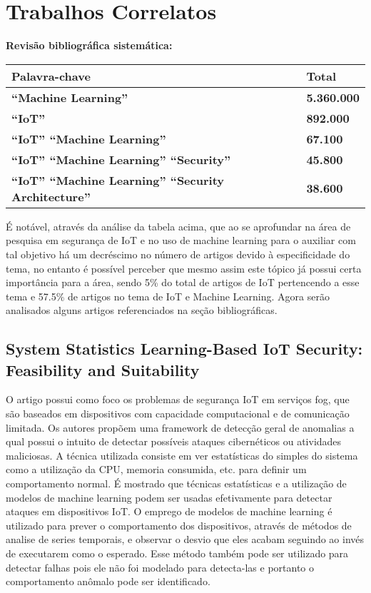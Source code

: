 \documentclass[article,12pt]{abntex2}
\begin{document}
\section{Trabalhos Correlatos}
\textbf{Revisão bibliográfica sistemática:}\\
\begin{tabular}{l l}
    \toprule
    \textbf{Palavra-chave}& \textbf{Total}  \\
    \midrule
    \textbf{``Machine Learning''}& \textbf{ 5.360.000 }\\
    \textbf{``IoT''}& \textbf{ 892.000 } \\
    \textbf{``IoT'' ``Machine Learning''}& \textbf{ 67.100 }\\
    \textbf{``IoT'' ``Machine Learning'' ``Security''}& \textbf{ 45.800 } \\
    \textbf{``IoT'' ``Machine Learning'' ``Security Architecture''}& \textbf{ 38.600 } \\
    \bottomrule
\end{tabular}

É notável, através da análise da tabela acima, que ao se aprofundar na área de pesquisa em segurança de IoT e no uso de machine learning para o auxiliar com tal objetivo há um decréscimo no número de artigos devido à especificidade do tema, no entanto é possível perceber que mesmo assim este tópico já possui certa importância para a área, sendo 5\% do total de artigos de IoT pertencendo a esse tema e 57.5\% de artigos no tema de IoT e Machine Learning. Agora serão analisados alguns artigos referenciados na seção bibliográficas.
\subsection{System Statistics Learning-Based IoT Security: Feasibility and Suitability}%
O artigo possui como foco os problemas de segurança IoT em serviços fog, que são baseados em dispositivos com capacidade computacional e de comunicação limitada. Os autores propõem uma framework de detecção geral de anomalias a qual possui o intuito de detectar possíveis ataques cibernéticos ou atividades maliciosas. A técnica utilizada consiste em ver estatísticas do simples do sistema como a utilização da CPU, memoria consumida, etc. para definir um comportamento normal. É mostrado que técnicas estatísticas e a utilização de modelos de machine learning podem ser usadas efetivamente para detectar ataques em dispositivos IoT. O emprego de modelos de machine learning é utilizado para prever o comportamento dos dispositivos, através  de métodos de analise de series temporais, e observar o desvio que eles acabam seguindo ao invés de executarem como o esperado. Esse método também pode ser utilizado para detectar falhas pois ele não foi modelado para detecta-las e portanto o comportamento anômalo pode ser identificado.
\end{document}
